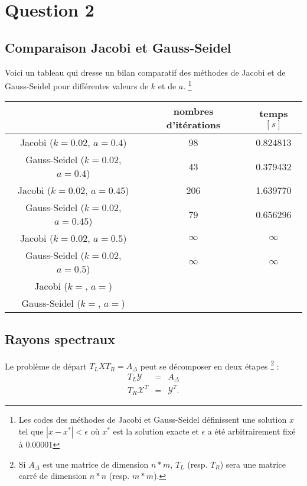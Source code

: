 \section{Question 2}
\subsection{Comparaison Jacobi et Gauss-Seidel}
Voici un tableau qui dresse un bilan comparatif des méthodes de Jacobi et de Gauss-Seidel pour différentes valeurs de $k$ et de $a$.
\footnote{Les codes des méthodes de Jacobi et Gauss-Seidel définissent une solution $x$
tel que $|x-x^*|<\epsilon$ où $x^*$ est la solution exacte et $\epsilon$ a été arbitrairement fixé à $0.00001$}

\begin{tabular}{|c|c|c|}
\hline
& nombres d'itérations & temps $[s]$\\
\hline
Jacobi ($k=0.02$, $a=0.4$) &98 &  0.824813\\
Gauss-Seidel ($k=0.02$, $a=0.4$) &43 & 0.379432 \\
\hline
Jacobi ($k=0.02$, $a=0.45$) &206 & 1.639770\\
Gauss-Seidel ($k=0.02$, $a=0.45$) & 79 & 0.656296 \\
\hline
Jacobi ($k=0.02$, $a=0.5$) & $\infty$ & $\infty$\\
Gauss-Seidel ($k=0.02$, $a=0.5$) & $\infty$ & $\infty$\\
\hline
Jacobi ($k=$, $a=$) & & \\
Gauss-Seidel ($k=$, $a=$) & & \\
\hline
\end{tabular}

\subsection{Rayons spectraux}
Le problème de départ $T_L X T_R = A_{\Delta}$ peut se décomposer en deux étapes \footnote{Si $A_{\Delta}$
est une matrice de dimension $n*m$, $T_L$ (resp. $T_R$) sera une  matrice carré de dimension $n*n$ (resp. $m*m$).} :
\begin{eqnarray}\label{eq_q2}
T_L \mathcal{Y} &=& A_{\Delta}\\
T_R \mathcal{X}^T &=& \mathcal{Y}^T.
\end{eqnarray}

